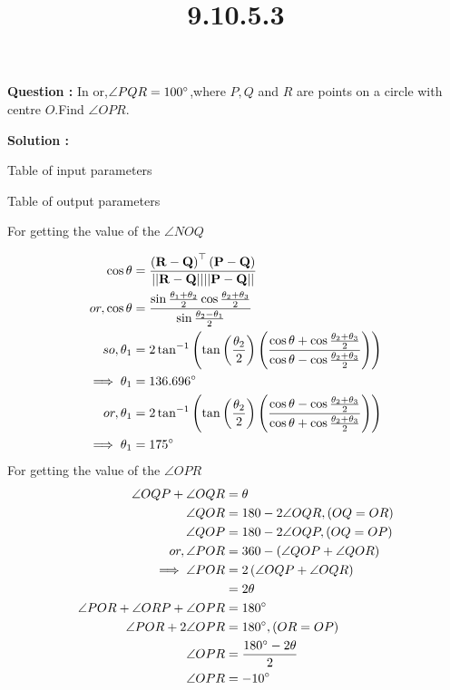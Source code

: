 \documentclass[12pt]{article}
\let\vec\mathbf
\providecommand{\brak}[1]{\ensuremath{\left(#1\right)}}
\providecommand{\norm}[1]{\ensuremath{\lvert|#1\rvert|}}
\begin{document}
\title{\textbf{9.10.5.3}}
\date{}
\maketitle
\textbf{Question :} In  or,$\angle PQR = 100\degree$,where $P,Q$ and $R$ are points on a circle with centre $O$.Find $\angle OPR$.

\textbf{Solution :}
\begin{table}[H]
    \centering
    
    \caption{Table of input parameters}
    \label{tab:tab:1}
\end{table}

\begin{table}[H]
    \centering
    
    \caption{Table of output parameters}
    \label{tab:tab:2}
\end{table}

For getting the value of the $\angle NOQ$

\begin{align}
    \cos{\theta}&=\frac{\brak{\vec{R-Q}}^{\top}\brak{\vec{P-Q}}}{\vec{\norm{R-Q}\norm{P-Q}}}\\
    or,\cos{\theta}&=\frac{\sin{\frac{\theta_1+\theta_2}{2}}\cos{\frac{\theta_2+\theta_3}{2}}}{\sin{\frac{\theta_2-\theta_1}{2}}}\\
    so,\theta_1&=2\tan^{-1}\brak{\tan\brak{{\frac{\theta_2}{2}}}\brak{\frac{\cos{\theta}+\cos{\frac{\theta_2+\theta_3}{2}}}{\cos{\theta}-\cos{\frac{\theta_2+\theta_3}{2}}}}}\\
    \implies \theta_1&=136.696\degree\\
    or,\theta_1&=2\tan^{-1}\brak{\tan\brak{{\frac{\theta_2}{2}}}\brak{\frac{\cos{\theta}-\cos{\frac{\theta_2+\theta_3}{2}}}{\cos{\theta}+\cos{\frac{\theta_2+\theta_3}{2}}}}}\\
    \implies \theta_1&=175\degree\\
\end{align}
For getting the value of the $\angle OPR$
\begin{align}
    \angle OQP +\angle OQR &=\theta\\
    \angle QOR &=180-2\angle OQR,\brak{OQ=OR}\\
        \angle QOP &=180-2\angle OQP,\brak{OQ=OP}\\
        or,\angle POR &= 360-\brak{\angle QOP+\angle QOR}\\
        \implies \angle POR &= 2\brak{\angle OQP +\angle OQR}\\
        &=2\theta\\
    \angle POR +\angle ORP +\angle OPR &= 180\degree\\
    \angle POR +2\angle OPR&= 180\degree, \brak{OR=OP}\\
\angle OPR &= \frac{180\degree-2\theta}{2}\\
 \angle OPR &=-10\degree
 \end{align}
\end{document}
